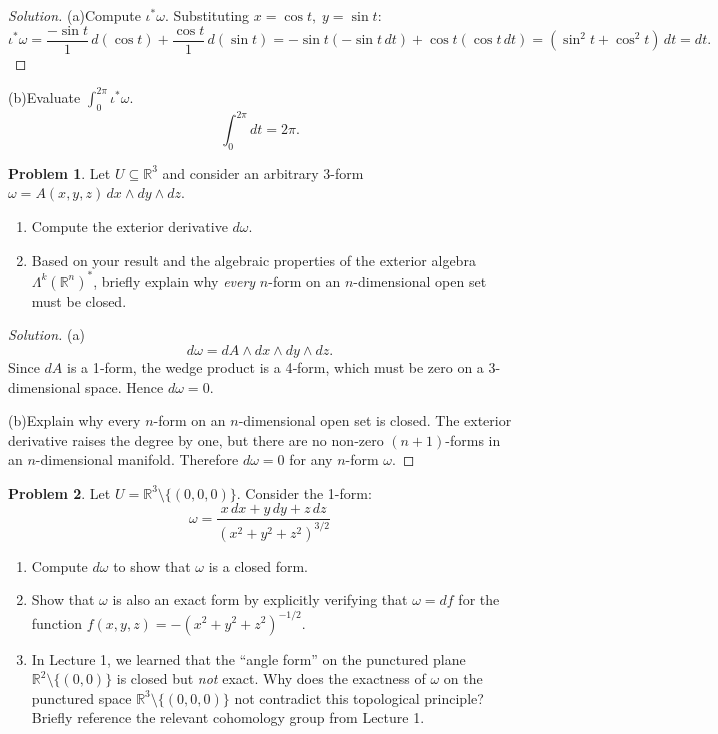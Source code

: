 \documentclass[12pt, a4paper]{article}
\theoremstyle{definition}
\newtheorem{problem}{Problem}
\newenvironment{solution}
  {\renewcommand\qedsymbol{$\blacksquare$}\begin{proof}[Solution]}
  {\end{proof}}
\begin{document}
\begin{solution}

(a)Compute \(\iota^{*}\omega\).
Substituting \(x=\cos t,\;y=\sin t\):
\[
\iota^{*}\omega = \frac{-\sin t}{1}\,d(\cos t) + \frac{\cos t}{1}\,d(\sin t) = -\sin t(-\sin t\,dt) + \cos t(\cos t\,dt) = (\sin^{2}t+\cos^{2}t)\,dt = dt.
\]
\end{solution}

(b)Evaluate \(\int_{0}^{2\pi}\iota^{*}\omega\).
\[
\int_{0}^{2\pi} dt = 2\pi.
\]

\vfill\newpage

\begin{problem}
Let $U \subseteq \mathbb{R}^3$ and consider an arbitrary 3-form $\omega = A(x,y,z) \, dx \wedge dy \wedge dz$.
\begin{enumerate}
    \item[(a)] Compute the exterior derivative $d\omega$. 
    \item[(b)] Based on your result and the algebraic properties of the exterior algebra $\Lambda^k(\mathbb{R}^n)^*$, briefly explain why \emph{every} $n$-form on an $n$-dimensional open set must be closed.
\end{enumerate}
\end{problem}

\begin{solution}

(a)\[
d\omega = dA\wedge dx\wedge dy\wedge dz.
\]
Since \(dA\) is a 1‑form, the wedge product is a 4‑form, which must be zero on a 3-dimensional space. Hence \(d\omega=0\).

(b)Explain why every \(n\)-form on an \(n\)-dimensional open set is closed.
The exterior derivative raises the degree by one, but there are no non‑zero \((n+1)\)-forms in an \(n\)-dimensional manifold. Therefore \(d\omega=0\) for any \(n\)-form \(\omega\).
\end{solution}

\vfill\newpage

\begin{problem}
Let $U = \mathbb{R}^3 \setminus \{(0,0,0)\}$. Consider the 1-form:
$$\omega = \frac{x \, dx + y \, dy + z \, dz}{(x^2+y^2+z^2)^{3/2}}$$
\begin{enumerate}
    \item[(a)] Compute $d\omega$ to show that $\omega$ is a closed form.
    \item[(b)] Show that $\omega$ is also an exact form by explicitly verifying that $\omega = df$ for the function $f(x,y,z) = -(x^2+y^2+z^2)^{-1/2}$.
    \item[(c)] In Lecture 1, we learned that the ``angle form'' on the punctured plane $\mathbb{R}^2 \setminus \{(0,0)\}$ is closed but \emph{not} exact. Why does the exactness of $\omega$ on the punctured space $\mathbb{R}^3 \setminus \{(0,0,0)\}$ not contradict this topological principle? Briefly reference the relevant cohomology group from Lecture 1.
\end{enumerate}
\end{problem}
\end{document}
